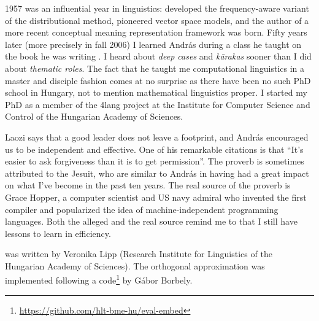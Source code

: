\documentclass[11pt]{article}
\begin{document}
1957 was an influential year in linguistics: \cite{Harris:1957} developed the
frequency-aware variant of the distributional method, \cite{Osgood:1957}
pioneered vector space models, and the author of a more recent conceptual
meaning representation framework \citep{Kornai:2010,Kornai:2017} was born.
Fifty years later (more precisely in fall 2006) I learned András during a class
he taught on the book he was writing \citep{Kornai:2007}. I heard about
\emph{deep cases} and \emph{k\={a}rakas} sooner than I did about \emph{thematic
roles}. The fact that he taught me computational linguistics in a master and
disciple fashion comes at no surprise as there have been no such PhD school in
Hungary, not to mention mathematical linguistics proper.
I started my PhD as a member of the 4lang project at the Institute for Computer
Science and Control of the Hungarian Academy of Sciences.

Laozi says that a good leader does not leave a footprint, and András encouraged
us to be independent and effective. One of his remarkable citations is that
``It's easier to ask forgiveness than it is to get permission''. The proverb is
sometimes attributed to the Jesuit, who are similar to András in having had a
great impact on what I've become in the past ten years. The real source of the
proverb is Grace Hopper, a computer scientist and US navy admiral who invented
the first compiler and popularized the idea of machine-independent programming
languages. Both the alleged and the real source remind me to that I still have
lessons to learn in efficiency.


\smallskip

 was written by Veronika Lipp (Research Institute for
Linguistics of the Hungarian Academy of Sciences). The orthogonal approximation
was implemented following a
code\footnote{\url{https://github.com/hlt-bme-hu/eval-embed}} by Gábor Borbely.



\end{document}
